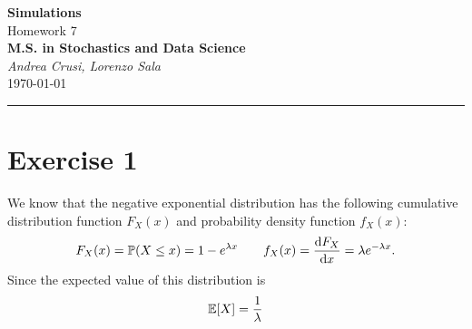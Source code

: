 \documentclass[12pt]{article}
\begin{document}
	\textcolor{UM_Brown}{
		\begin{center}
			\textbf{\Large Simulations}\\
			\vspace{5pt}
			Homework 7 \\
			\vspace{5pt}
			\textbf{M.S. in Stochastics and Data Science}\\
			\vspace{20pt}
			\textit{Andrea Crusi, Lorenzo Sala} \\
			\vspace{5pt}
			\today
		\end{center}
		\vspace{10pt}
		\hrule
	}
	
	
	
	\section{Exercise 1}
	We know that the negative exponential distribution has the following cumulative distribution function $F_X(x)$ and probability density function $f_X(x)$:
	\begin{equation*}
		F_X(x)=\mathbb{P}(X\leq x)=1-e^{\lambda x}\qquad f_X(x)=\frac{\mathop{}\!\mathrm{d} F_X}{\mathop{}\!\mathrm{d} x}=\lambda e^{-\lambda x}.
	\end{equation*}
	Since the expected value of this distribution is
	\begin{equation*}
		\mathbb{E}[X]=\frac{1}{\lambda}
	\end{equation*}
\end{document}

